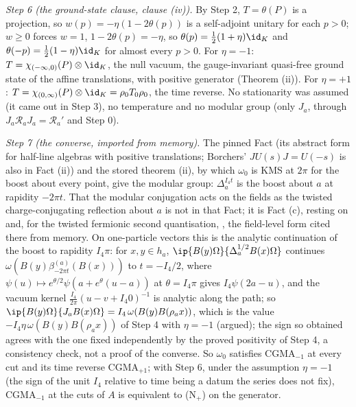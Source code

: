 \emph{Step 6 (the ground-state clause, clause (iv)).} By Step 2, $T = \theta(P)$ is a projection, so $w(p) = -\eta(1 - 2\theta(p))$ is a self-adjoint unitary for each $p > 0$; $w \ge 0$ forces $w = 1$, $1 - 2\theta(p) = -\eta$, so $\theta(p) = \tfrac12(1 + \eta)\id_{K}$ and $\theta(-p) = \tfrac12(1 - \eta)\id_{K}$ for almost every $p > 0$. For $\eta = -1$: $T = \chi_{(-\infty, 0)}(P)\otimes\id_{K}$, the null vacuum, the gauge-invariant quasi-free ground state of the affine translations, with positive generator (Theorem (ii)). For $\eta = +1$: $T = \chi_{(0, \infty)}(P)\otimes\id_{K} = \rho_{0}T_{0}\rho_{0}$, the time reverse. No stationarity was assumed (it came out in Step 3), no temperature and no modular group (only $J_{a}$, through $J_{a}\mathcal{R}_{a}J_{a} = \mathcal{R}_{a}'$ and Step 0).

\emph{Step 7 (the converse, imported from memory).} The pinned Fact  (its abstract form for half-line algebras with positive translations; Borchers' $JU(s)J = U(-s)$ is also in Fact (ii)) and the stored theorem (ii), by which $\omega_{0}$ is KMS at $2\pi$ for the boost about every point, give the modular group: $\Delta_{a}^{I_{4}t}$ is the boost about $a$ at rapidity $-2\pi t$. That the modular conjugation acts on the fields as the twisted charge-conjugating reflection about $a$ is not in that Fact; it is Fact (c), resting on \cite{BGL1993} and, for the twisted fermionic second quantisation, \cite{BJL2002}, the field-level form cited there from memory. On one-particle vectors this is the analytic continuation of the boost to rapidity $I_{4}\pi$: for $x, y \in h_{a}$, $\ip{B(y)\Omega}{\Delta_{a}^{1/2}B(x)\Omega}$ continues $\omega(B(y)\beta^{(a)}_{-2\pi t}(B(x)))$ to $t = -I_{4}/2$, where $\psi(u) \mapsto e^{\theta/2}\psi(a + e^{\theta}(u - a))$ at $\theta = I_{4}\pi$ gives $I_{4}\psi(2a - u)$, and the vacuum kernel $\tfrac{I_{4}}{2\pi}(u - v + I_{4}0)^{-1}$ is analytic along the path; so $\ip{B(y)\Omega}{J_{a}B(x)\Omega} = I_{4}\,\omega(B(y)B(\rho_{a}x))$, which is the value $-I_{4}\eta\,\omega(B(y)B(\rho_{a}x))$ of Step 4 with $\eta = -1$ (argued); the sign so obtained agrees with the one fixed independently by the proved positivity of Step 4, a consistency check, not a proof of the converse. So $\omega_{0}$ satisfies CGMA$_{-1}$ at every cut and its time reverse CGMA$_{+1}$; with Step 6, under the assumption $\eta = -1$ (the sign of the unit $I_{4}$ relative to time being a datum the series does not fix), CGMA$_{-1}$ at the cuts of $A$ is equivalent to (N$_{+}$) on the generator.

